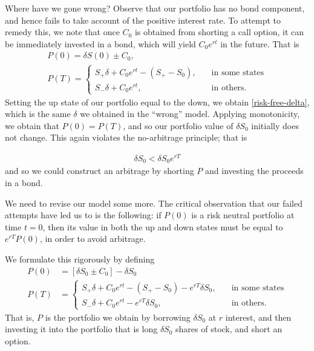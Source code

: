 \documentclass[12pt]{amsbook}
\theoremstyle{plain}
\theoremstyle{definition}
\theoremstyle{remark}
\numberwithin{equation}{section}  %
\begin{document}
Where have we gone wrong? Observe that our portfolio has no bond component,
and hence fails to take account of the positive interest rate. To attempt to remedy this, we note that  once $C_{0}$ is obtained from shorting a call option, it can be
immediately invested in a bond, which will yield $C_{0}e^{rt}$ in the future.
That is
\begin{gather*}
	P(0)  = \delta S(0) \pm C_{0},
	\\
	P(T)  = \begin{cases}
		S_{+} \delta + C_{0}e^{rt} - (S_{+} - S_{0}), \quad & \text{in some states}
		\\
		S_{-} \delta + C_{0}e^{rt}, \quad & \text{in others}.
	\end{cases}
\end{gather*}
Setting the up state of our portfolio equal to the down, we obtain
\eqref{risk-free-delta},
which is the same $\delta$ we obtained in the ``wrong'' model. 
Applying monotonicity, we obtain that $P(0) = P(T)$, and so our portfolio value
of $\delta S_{0}$ initially does not change. This again violates the
no-arbitrage principle; that is

\begin{equation*}
	\begin{split}
		\delta S_{0} < \delta S_{0} e^{rT}
	\end{split}
\end{equation*}
and so we could construct an arbitrage by shorting $P$ and investing
the proceeds in a bond.

We need to revise our model some more. The critical observation that our failed
attempts have led us to is the following: if $P(0)$
is a risk neutral portfolio at time $t=0$, then its value in both the up and down
states must be equal to $e^{rT}P(0)$, in order to avoid arbitrage. 

We formulate this rigorously by defining
\begin{align*}
	P(0) & = [\delta S_{0} \pm C_{0}] - \delta S_{0}
	\\
	P(T)  & = \begin{cases}
		S_{+} \delta + C_{0}e^{rt} - (S_{+} - S_{0}) - e^{rT} \delta S_{0}, \quad & \text{in some states}
		\\
		S_{-} \delta + C_{0}e^{rt} - e^{rT} \delta S_{0}, \quad & \text{in others}.
	\end{cases}
\end{align*}
That is, $P$ is the portfolio we obtain by borrowing $\delta S_{0}$
at $r$ interest, and then investing it into the portfolio that is long
$\delta S_{0}$ shares of stock, and short an option.
\end{document}
